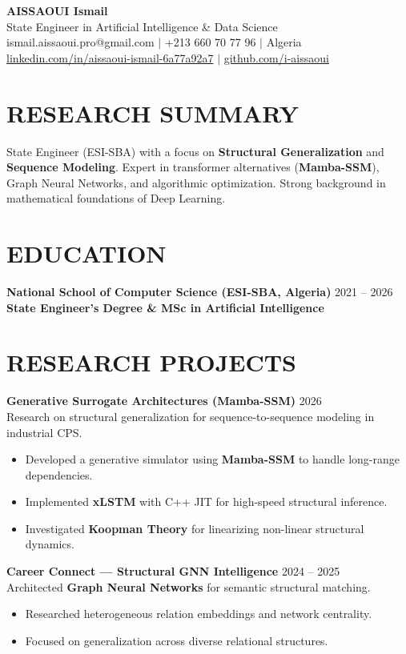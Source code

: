 \documentclass[a4paper,11pt]{article}
\begin{document}
\begin{center}
    {\Huge\bfseries\color{titleblue} AISSAOUI Ismail}\\[4pt]
    {\Large State Engineer in Artificial Intelligence \& Data Science}\\[6pt]
    ismail.aissaoui.pro@gmail.com $|$ +213 660 70 77 96 $|$ Algeria \\
    \href{https://linkedin.com/in/aissaoui-ismail-6a77a92a7}{linkedin.com/in/aissaoui-ismail-6a77a92a7} $|$ \href{https://github.com/i-aissaoui}{github.com/i-aissaoui}
\end{center}

\section{RESEARCH SUMMARY}
State Engineer (ESI-SBA) with a focus on \textbf{Structural Generalization} and \textbf{Sequence Modeling}. Expert in transformer alternatives (\textbf{Mamba-SSM}), Graph Neural Networks, and algorithmic optimization. Strong background in mathematical foundations of Deep Learning.

\section{EDUCATION}
\textbf{National School of Computer Science (ESI-SBA, Algeria)} \hfill 2021 -- 2026 \\
\textbf{State Engineer's Degree \& MSc in Artificial Intelligence}

\section{RESEARCH PROJECTS}

\textbf{Generative Surrogate Architectures (Mamba-SSM)} \hfill 2026 \\
Research on structural generalization for sequence-to-sequence modeling in industrial CPS.
\begin{itemize}
    \item Developed a generative simulator using \textbf{Mamba-SSM} to handle long-range dependencies.
    \item Implemented \textbf{xLSTM} with C++ JIT for high-speed structural inference.
    \item Investigated \textbf{Koopman Theory} for linearizing non-linear structural dynamics.
\end{itemize}

\textbf{Career Connect — Structural GNN Intelligence} \hfill 2024 -- 2025 \\
Architected \textbf{Graph Neural Networks} for semantic structural matching.
\begin{itemize}
    \item Researched heterogeneous relation embeddings and network centrality.
    \item Focused on generalization across diverse relational structures.
\end{itemize}
\end{document}
